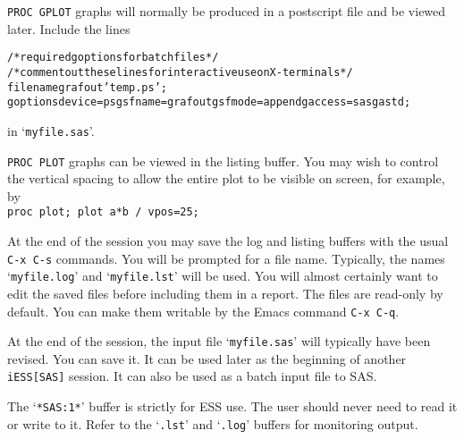\documentclass{article}
\newcommand{\stexttt}[1]{{\small\texttt{#1}}}
\newenvironment{Salltt}{\small\begin{alltt}}{\end{alltt}}
\newcommand{\file}[1]{`\stexttt{#1}'}
\begin{document}
\stexttt{PROC GPLOT} graphs will normally be produced in a postscript
file and be viewed later.  Include the lines
\begin{Salltt}
    /* required goptions for batch files */
    /* comment out these lines for interactive use on X-terminals*/
    filename grafout 'temp.ps';
    goptions device=ps gsfname=grafout gsfmode=append gaccess=sasgastd;
\end{Salltt}
\noindent
in \file{myfile.sas}.

\stexttt{PROC PLOT} graphs can be viewed in the listing buffer.  You
may wish to control the vertical spacing to allow the entire plot to
be visible on screen, for example, by\\
\stexttt{proc plot; plot a*b / vpos=25;}
 
At the end of the session you may save the log and listing buffers
with the usual \stexttt{C-x C-s} commands.  You will be prompted for a
file name.  Typically, the names \file{myfile.log} and
\file{myfile.lst} will be used.  You will almost certainly want to
edit the saved files before including them in a report.  The files are
read-only by default.  You can make them writable by the Emacs command
\stexttt{C-x C-q}.
 
At the end of the session, the input file \file{myfile.sas} will
typically have been revised.  You can save it.  It can be used later
as the beginning of another \stexttt{iESS[SAS]} session.  It can also
be used as a batch input file to SAS.
 
The \file{*SAS:1*} buffer is strictly for ESS use.  The user should
never need to read it or write to it.  Refer to the \file{.lst} and
\file{.log} buffers for monitoring output.

\end{document}
